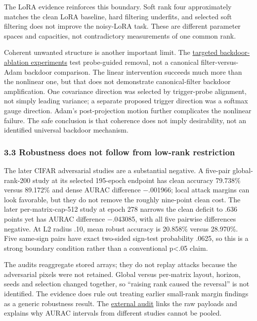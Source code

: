 \documentclass[
  british,
  10pt,
  a4paper,
]{article}
\begin{document}
The LoRA evidence reinforces this boundary. Soft rank four approximately
matches the clean LoRA baseline, hard filtering underfits, and selected
soft filtering does not improve the noisy-LoRA task. These are different
parameter spaces and capacities,\allowbreak{} not contradictory
measurements of one common rank.

Coherent unwanted structure is another important limit. The
\href{../../../research/targeted_ablation_findings.md}{targeted
backdoor-\allowbreak{}ablation experiments} test
probe-\allowbreak{}guided removal, not a canonical
filter-\allowbreak{}versus-\allowbreak{}Adam backdoor
comparison.\allowbreak{} The linear intervention succeeds much more than
the nonlinear one, but that does not demonstrate
canonical-\allowbreak{}filter backdoor
amplificatio\allowbreak{}n.\allowbreak{} One covariance direction was
selected by trigger-\allowbreak{}probe alignment, not simply leading
variance; a separate proposed trigger direction was a softmax gauge
direction. Adam's post-\allowbreak{}projection motion further
complicates the nonlinear failure. The safe conclusion is that coherence
does not imply desirability\allowbreak{},\allowbreak{} not an identified
universal backdoor mechanism.

\subsubsection{3.3 Robustness does not follow from low-rank
restriction}\label{synthesis--robustness-does-not-follow-from-low-rank-restriction}

The later CIFAR adversarial studies are a substantial negative. A
five-pair global-\allowbreak{}rank-\allowbreak{}200 study at its
selected 195-epoch endpoint has clean accuracy 79.738\% versus 89.172\%
and dense AURAC difference −.001966; local attack margins can look
favorable, but they do not remove the roughly nine-point clean cost. The
later per-\allowbreak{}matrix-\allowbreak{}cap-\allowbreak{}512 study at
epoch 278 narrows the clean deficit to .636 points yet has AURAC
difference −.043085, with all five pairwise differences negative. At L2
radius .10, mean robust accuracy is 20.858\% versus 28.970\%. Five
same-sign pairs have exact two-sided sign-test probability .0625, so
this is a strong boundary condition rather than a conventional
p\textless.05 claim.

The audits reaggregate stored arrays; they do not replay attacks because
the adversarial pixels were not retained. Global versus per-matrix
layout, horizon, seeds and selection changed together, so ``raising rank
caused the reversal'' is not identified.\allowbreak{} The evidence does
rule out treating earlier small-rank margin findings as a generic
robustness result. The
\href{../audit/external-results-audit.md}{external audit} links the raw
payloads and explains why AURAC intervals from different studies cannot
be pooled.
\end{document}
